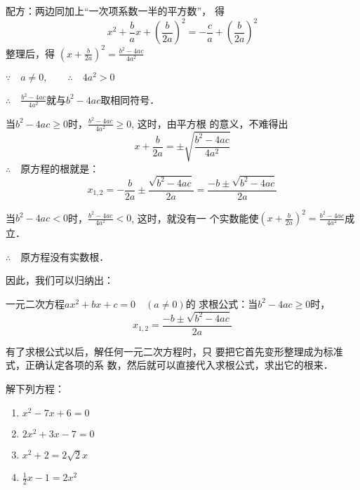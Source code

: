 配方：两边同加上“一次项系数一半的平方数”，
得
\[x^2+\frac{b}{a}x+\left(\frac{b}{2a}\right)^2=-\frac{c}{a}+\left(\frac{b}{2a}\right)^2\]
整理后，得 $\left(x+\frac{b}{2a}\right)^2=\frac{b^2-4ac}{4a^2}$

$\because\quad a\ne 0, \qquad \therefore\quad 4a^2>0$

$\therefore\quad \frac{b^2-4ac}{4a^2}$就与$b^2-4ac$取相同符号．

当$b^2-4ac\ge 0$时，$\frac{b^2-4ac}{4a^2}\ge 0$, 这时，由平方根
的意义，不难得出
\[x+\frac{b}{2a}=\pm\sqrt{\frac{b^2-4ac}{4a^2}}\]
$\therefore\quad $原方程的根就是：
\[x_{1,2}=-\frac{b}{2a}\pm \frac{\sqrt{b^2-4ac}}{2a}=\frac{-b\pm \sqrt{b^2-4ac}}{2a} \]

当$b^2-4ac<0$时，$\frac{b^2-4ac}{4a^2}<0$, 这时，就没有一
个实数能使$\left(x+\frac{b}{2a}\right)^2=\frac{b^2-4ac}{4a^2}$成立．

$\therefore\quad $原方程没有实数根．

因此，我们可以归纳出：
\begin{blk}{}
    一元二次方程$ax^2+bx+c=0\quad (a\ne 0)$的
    求根公式：当$b^2-4ac\ge 0$时，
\[x_{1,2}=\frac{-b\pm\sqrt{b^2-4ac}}{2a} \]
\end{blk}

有了求根公式以后，解任何一元二次方程时，只
要把它首先变形整理成为标准式，正确认定各项的系
数，然后就可以直接代入求根公式，求出它的根来．

\begin{example}
    解下列方程：
    \begin{multicols}{2}
\begin{enumerate}
    \item $x^2-7x+6=0$
    \item $2x^2+3x-7=0$
    \item $x^2+2=2\sqrt{2}x$
    \item $\frac{1}{2}x-1=2x^2$
\end{enumerate}
    \end{multicols}
\end{example}

